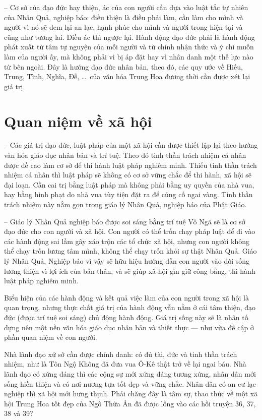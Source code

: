 -- Cơ sở của đạo đức hay thiện, ác của con người cần dựa vào luật tắc tự nhiên của Nhân Quả, nghiệp báo: điều thiện là điều phải làm, cần làm cho mình và người vì nó sẽ đem lại an lạc, hạnh phúc cho mình và người trong hiện tại và cũng như tương lai. Điều ác thì ngược lại. Hành động đạo đức phải là hành động phát xuất từ tâm tự nguyện của mỗi người và từ chính nhận thức và ý chí muốn làm của người ấy, mà không phải vì bị áp đặt hay vì nhân danh một thế lực nào từ bên ngoài. Đây là hướng đạo đức nhân bản, theo đó, các quy ước về Hiếu, Trung, Tình, Nghĩa, Đễ, \ldots ~của văn hóa Trung Hoa đương thời cần được xét lại giá trị.

\section{Quan niệm về xã hội} %
\label{sec:36_37_xa_hoi}

-- Các giá trị đạo đức, luật pháp của một xã hội cần được thiết lập lại theo hướng văn hóa giáo dục nhân bản và trí tuệ. Theo đó tinh thần trách nhiệm cá nhân được đề cao làm cơ sở để thi hành luật pháp nghiêm minh. Thiếu tinh thần trách nhiệm cá nhân thì luật pháp sẽ không có cơ sở vững chắc để thi hành, xã hội sẽ đại loạn. Cần cai trị bằng luật pháp mà không phải bằng uy quyền của nhà vua, hay bằng hình phạt do nhà vua tùy tiện đặt ra để củng cố ngai vàng. Tinh thần trách nhiệm này nằm gọn trong giáo lý Nhân Quả, nghiệp báo của Phật Giáo.

-- Giáo lý Nhân Quả nghiệp báo được soi sáng bằng trí tuệ Vô Ngã sẽ là cơ sở đạo đức cho con người và xã hội. Con người có thể trốn chạy pháp luật để đi vào các hành động sai lầm gây xáo trộn các tổ chức xã hội, nhưng con người không thể chạy trốn lương tâm mình, không thể chạy trốn khỏi sự thật Nhân Quả. Giáo lý Nhân Quả, Nghiệp báo vì vậy sẽ hữu hiệu hướng dẫn con người vào đời sống lương thiện vì lợi ích của bản thân, và sẽ giúp xã hội gìn giữ công bằng, thi hành luật pháp nghiêm minh.

Biểu hiện của các hành động và kết quả việc làm của con người trong xã hội là quan trọng, nhưng thực chất giá trị của hành động vẫn nằm ở cái tâm thiện, đạo đức (được trí tuệ soi sáng) chủ động hành động. Giá trị sống này sẽ là nhân tố dựng nên một nền văn hóa giáo dục nhân bản và thiết thực --- như vừa đề cập ở phần quan niệm về con người.

Nhà lãnh đạo xứ sở cần được chính danh: có đủ tài, đức và tinh thần trách nhiệm, như là Tôn Ngộ Không đã đưa vua Ô-Kê thật trở về lại ngai báu. Nhà lãnh đạo có xứng đáng thì các cộng sự mới xứng đáng tương xứng, nhân dân mới sống hiền thiện và có nơi nương tựa tốt đẹp và vững chắc. Nhân dân có an cư lạc nghiệp thì xã hội mới hưng thịnh. Phải chăng đây là tâm sự, thao thức về một xã hội Trung Hoa tốt đẹp của Ngô Thừa Ân đã được lồng vào các hồi truyện 36, 37, 38 và 39?

